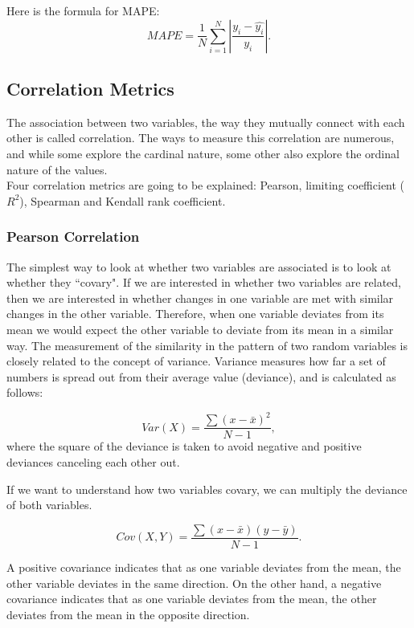 Here is the formula for MAPE:
\begin{equation}
MAPE=\frac{1}{N}\sum_{i=1}^N\left|\frac{y_i-\hat{y_i}}{y_i}\right|.
\end{equation}

\subsection{Correlation Metrics}
The association between two variables, the way they mutually connect with each other is called correlation. The ways to measure this correlation are numerous, and while some explore the cardinal nature, some other also explore the ordinal nature of the values.\\

Four correlation metrics are going to be explained: Pearson, limiting coefficient ($R^2$), Spearman and Kendall rank coefficient. 

\subsubsection{Pearson Correlation}

The simplest way to look at whether two variables are associated is to look at whether they ``covary". If we are interested in whether two variables are related, then we are interested in whether changes in one variable are met with similar changes  in  the  other  variable.  Therefore,  when  one  variable  deviates  from  its  mean  we would expect the other variable to deviate from its mean in a similar way. The measurement of the similarity in the pattern of two random variables is closely related to the concept of variance. Variance measures how far a set of numbers is spread out from their average value (deviance), and is calculated as follows:

\begin{equation}
Var(X) = \frac{\sum(x-\bar x)^{2}}{N-1},
\end{equation}
where the square of the deviance is taken to avoid negative and positive deviances canceling each other out.

If we want to understand how two variables covary, we can multiply the deviance of both variables.

\begin{equation}
Cov(X, Y) = \frac{\sum(x-\bar x)(y-\bar y)}{N-1}.
\end{equation}

A  positive  covariance  indicates  that  as  one  variable  deviates  from  the  mean, the other variable deviates in the same direction. On the other hand, a negative covariance indicates that as one variable deviates from the mean, the other deviates from the mean in the opposite direction.

